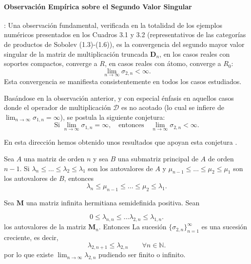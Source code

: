 \paragraph{Observación Empírica sobre el Segundo Valor Singular}: Una observación fundamental, verificada en la totalidad de los ejemplos numéricos presentados en los Cuadros 3.1 y 3.2 (representativos de las categorías de productos de Sobolev (1.3)-(1.6)), es la convergencia del segundo mayor valor singular de la matriz de multiplicación truncada $\mathbf{D}_n$, en los casos reales con soportes compactos, converge a $R$, en casos reales con átomo, converge a $R_0$:
$$
  \lim_{n \to \infty} \sigma_{2,n} < \infty.
$$
Esta convergencia se manifiesta consistentemente en todos los casos estudiados.

\begin{conjetura}
  \label{conj:sigma2_Dn_bounded_if_sigma1_unbounded}
  Basándose en la observación anterior, y con especial énfasis en aquellos casos donde el operador de multiplicación $\mathcal{D}$ es no acotado (lo cual se infiere de $\lim_{n \to \infty} \sigma_{1,n} = \infty$), se postula la siguiente conjetura:
  $$
    \text{Si } \lim_{n \to \infty} \sigma_{1,n} = \infty, \quad \text{entonces} \quad \lim_{n \to \infty} \sigma_{2,n} < \infty.
  $$
\end{conjetura}

\noindent En esta dirección hemos obtenido unos resultados que apoyan esta conjetura \cite{singularValuesOfHessenbergMatrices}.

 \cite{Bhatia1997} Sea  $A$ una matriz de orden  $n$ y sea  $B$ una submatriz principal de  $A$ de  orden  $n-1$. Si $\lambda_n\leq \dots \leq \lambda_2\leq \lambda_1$ son los autovalores de $A$ y  $\mu_{n-1}\leq \dots \leq \mu_2\leq \mu_1$ son los autovalores de $B$, entonces
$$
  \lambda_n \leq \mu_{n-1} \leq \dots \leq \mu_2 \leq \lambda_1.
$$


\begin{proposition} Sea $\mathbf{M}$ una matriz infinita  hermitiana semidefinida positiva. Sean

  $$
    0 \leq \lambda_{n,n}\leq \dots \lambda_{2,n} \leq \lambda_{1,n}.
  $$
  \noindent los autovalores de la matriz $\mathbf{M}_n$. Entonces La sucesión $\{ \sigma_{2,n}\}_{n=1}^{\infty}$ es una sucesión creciente, es decir,
  $$
    \lambda_{2,n+1} \leq \lambda_{2,n} \qquad \forall n\in \mathbb{N}.
  $$
  \noindent por lo que existe $\displaystyle{\lim_{n\to \infty} \lambda_{2,n}}$ pudiendo ser finito o infinito.
\end{proposition}


